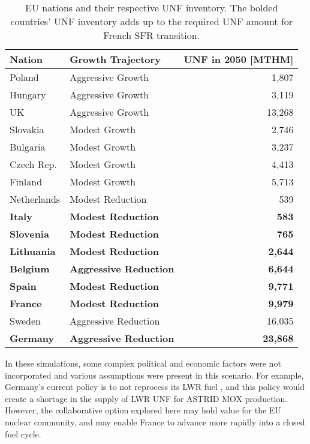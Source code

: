 \begin{table}[h]
    \centering
    \caption {\gls{EU} nations and their respective \gls{UNF} inventory. The bolded countries'
              \gls{UNF} inventory adds up to the required \gls{UNF} amount for French \gls{SFR} transition. }
                \begin{tabularx}{\textwidth}{llr}
                    \hline 
                    \textbf{Nation} & \textbf{Growth Trajectory} & \small{\textbf{UNF in 2050 [MTHM] }}\\
                    \hline
                    Poland & Aggressive Growth & 1,807\\
                    Hungary & Aggressive Growth & 3,119 \\ 
                    UK & Aggressive Growth & 13,268\\
                    Slovakia & Modest Growth & 2,746\\
                    Bulgaria & Modest Growth & 3,237 \\
                    Czech Rep. & Modest Growth & 4,413\\
                    Finland & Modest Growth &  5,713\\
                    Netherlands & Modest Reduction & 539\\
                    \textbf{Italy} & \textbf{Modest Reduction} & \textbf{583}\\
                    \textbf{Slovenia} & \textbf{Modest Reduction} & \textbf{765}\\
                    \textbf{Lithuania} & \textbf{Modest Reduction} & \textbf{2,644} \\
                    \textbf{Belgium} & \textbf{Aggressive Reduction} & \textbf{6,644}\\
                    \textbf{Spain} & \textbf{Modest Reduction} &  \textbf{9,771} \\
                    \textbf{France} & \textbf{Modest Reduction} & \textbf{9,979} \\
                    Sweden & Aggressive Reduction & 16,035\\
                    \textbf{Germany} & \textbf{Aggressive Reduction} & \textbf{23,868}\\
                    \hline
                \end{tabularx}
    
    \label{tab:which_send}

\end{table}

In these simulations, some complex political and economic factors were not 
incorporated and various assumptions were present in this scenario. For
example, Germany's current policy is to not reprocess its \gls{LWR} fuel
\cite{topfer_germany_2011}, and this policy would create a shortage
in the supply of \gls{LWR} \gls{UNF} for \gls{ASTRID} \gls{MOX} production.
However,
the collaborative option explored here may hold value for the \gls{EU} nuclear community,
and may enable France to advance more rapidly into a closed fuel cycle.

\FloatBarrier
